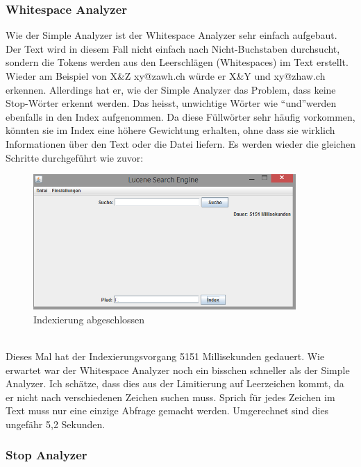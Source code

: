 \documentclass[12pt,a4paper,ngerman]{report}
\begin{document}
\subsubsection*{Whitespace Analyzer}
Wie der Simple Analyzer ist der Whitespace Analyzer sehr einfach aufgebaut. Der Text wird in diesem Fall nicht einfach nach Nicht-Buchstaben durchsucht, sondern die Tokens werden aus den Leerschlägen (Whitespaces) im Text erstellt. Wieder am Beispiel von X\&Z xy@zawh.ch würde er X\&Y und xy@zhaw.ch erkennen. Allerdings hat er, wie der Simple Analyzer das Problem, dass keine Stop-Wörter erkennt werden. Das heisst, unwichtige Wörter wie \textquotedblleft und\textquotedblright werden ebenfalls in den Index aufgenommen. Da diese Füllwörter sehr häufig vorkommen, könnten sie im Index eine höhere Gewichtung erhalten, ohne dass sie wirklich Informationen über den Text oder die Datei liefern.
\newpage
Es werden wieder die gleichen Schritte durchgeführt wie zuvor:
\begin{figure}[h!]
\centering
\includegraphics[width=10cm]{img/whitespace-analyzer-index.png}
\caption{Indexierung abgeschlossen\protect\footnotemark}
\end{figure}
\\
Dieses Mal hat der Indexierungsvorgang 5151 Millisekunden gedauert. Wie erwartet war der Whitespace Analyzer noch ein bisschen schneller als der Simple Analyzer. Ich schätze, dass dies aus der Limitierung auf Leerzeichen kommt, da er nicht nach verschiedenen Zeichen suchen muss. Sprich für jedes Zeichen im Text muss nur eine einzige Abfrage gemacht werden. Umgerechnet sind dies ungefähr 5,2 Sekunden.
\subsubsection*{Stop Analyzer}
\end{document}
